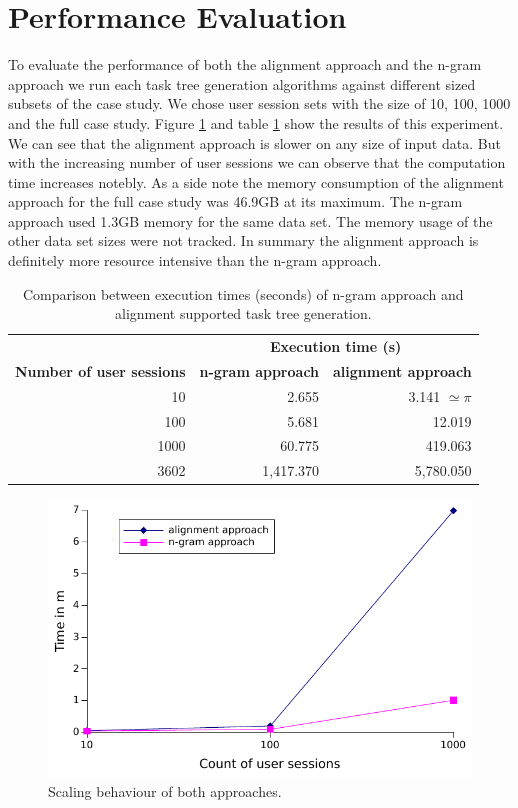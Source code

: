 \section{Performance Evaluation}
To evaluate the performance of both the alignment approach and the n-gram approach we run each task tree generation algorithms against different sized subsets of the case study.
We chose user session sets with the size of 10, 100, 1000 and the full case study. Figure \ref{fig:performance} and table \ref{tab:comparisontasktreegenerations} show the results of this experiment.
We can see that the alignment approach is slower on any size of input data.
But with the increasing number of user sessions we can observe that the computation time increases notebly.
As a side note the memory consumption of the alignment approach for the full case study was 46.9GB at its maximum.
The n-gram approach used 1.3GB memory for the same data set.
The memory usage of the other data set sizes were not tracked.
In summary the alignment approach is definitely more resource intensive than the n-gram approach.
\begin{table}[h]
	\centering
	\begin{tabular}{ r r r }
		\toprule
		& \multicolumn{2}{c}{\textbf{Execution time (s)}} \\
		\cmidrule{2-3}
		\textbf{Number of user sessions} & \textbf{n-gram approach} & \textbf{alignment approach} \\
		\midrule
		10 	& 2.655	& 3.141 $\simeq \pi$ \\
		100 	& 5.681	& 12.019\\
		1000 	& 60.775	& 419.063\\
		\midrule
		3602 	& 1,417.370 & 5,780.050\\
		\bottomrule
	\end{tabular}
	\caption{Comparison between execution times (seconds) of n-gram approach and alignment supported task tree generation.}
	\label{tab:comparisontasktreegenerations}
\end{table}


 \begin{figure}[h]
	\centering
	\includegraphics[]{chapters/casestudy/performance.pdf}
	\caption{Scaling behaviour of both approaches.}
	\label{fig:performance}
\end{figure}


